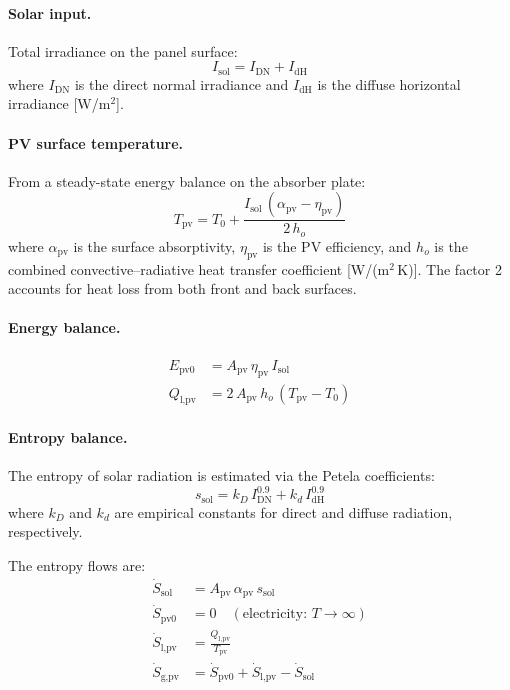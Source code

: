 \paragraph{Solar input.}
Total irradiance on the panel surface:
\begin{equation}\label{eq:pv-I-sol}
  I_\text{sol} = I_\text{DN} + I_\text{dH}
\end{equation}
where $I_\text{DN}$ is the direct normal irradiance and $I_\text{dH}$ is the diffuse horizontal irradiance [W/m$^2$].

\paragraph{PV surface temperature.}
From a steady-state energy balance on the absorber plate:
\begin{equation}\label{eq:pv-Tpv}
  T_\text{pv} = T_0 + \frac{I_\text{sol}\,(\alpha_\text{pv} - \eta_\text{pv})}{2\,h_o}
\end{equation}
where $\alpha_\text{pv}$ is the surface absorptivity, $\eta_\text{pv}$ is the PV efficiency, and $h_o$ is the combined convective--radiative heat transfer coefficient [W/(m$^2$\,K)]. The factor 2 accounts for heat loss from both front and back surfaces.

\paragraph{Energy balance.}
\begin{align}
  E_\text{pv0} &= A_\text{pv}\,\eta_\text{pv}\,I_\text{sol}     \label{eq:pv-Epv0} \\
  Q_\text{l,pv} &= 2\,A_\text{pv}\,h_o\,(T_\text{pv} - T_0)     \label{eq:pv-Qlpv}
\end{align}

\paragraph{Entropy balance.}
The entropy of solar radiation is estimated via the Petela coefficients:
\begin{equation}\label{eq:pv-s-sol}
  s_\text{sol} = k_D\,I_\text{DN}^{0.9} + k_d\,I_\text{dH}^{0.9}
\end{equation}
where $k_D$ and $k_d$ are empirical constants for direct and diffuse radiation, respectively.

The entropy flows are:
\begin{align}
  \dot{S}_\text{sol}  &= A_\text{pv}\,\alpha_\text{pv}\,s_\text{sol}   \label{eq:pv-Ssol}  \\
  \dot{S}_\text{pv0}  &= 0 \quad (\text{electricity: } T \to \infty)    \label{eq:pv-Spv0}  \\
  \dot{S}_\text{l,pv} &= \frac{Q_\text{l,pv}}{T_\text{pv}}             \label{eq:pv-Slpv}  \\
  \dot{S}_\text{g,pv} &= \dot{S}_\text{pv0} + \dot{S}_\text{l,pv} - \dot{S}_\text{sol} \label{eq:pv-Sgpv}
\end{align}

